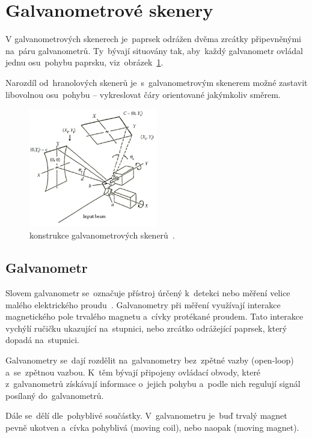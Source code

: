 \section{Galvanometrové skenery}
V galvanometrových skenerech je~paprsek odrážen dvěma zrcátky připevněnými na~páru galvanometrů. Ty~bývají situovány tak, aby~každý galvanometr ovládal jednu osu~pohybu paprsku, viz~obrázek~\ref{fig:scanner-constructions}.~\cite{scanning-handbook}

Narozdíl od~hranolových skenerů je~s~galvanometrovým skenerem možné zastavit libovolnou osu~pohybu -- vykreslovat čáry orientované jakýmkoliv směrem.

\begin{figure}[htb]
  \centering
  \includegraphics[width=0.5\textwidth]{img/scanner-constructions.jpg}
  \caption{\label{fig:scanner-constructions} konstrukce galvanometrových skenerů~\cite{scanning-handbook}.}
\end{figure}

\subsection{Galvanometr}
Slovem galvanometr se~označuje přístroj úrčený k~detekci nebo měření velice malého elektrického proudu~\cite{galvo-definition}. Galvanometry při měření využívají interakce magnetického pole trvalého magnetu a~cívky protékané proudem. Tato interakce vychýlí ručičku ukazující na~stupnici, nebo zrcátko odrážející paprsek, který dopadá na~stupnici.~\cite{wiki-galvo}

Galvanometry se~dají rozdělit na~galvanometry bez~zpětné vazby (open-loop) a~se~zpětnou vazbou. K~těm bývají připojeny ovládací obvody, které z~galvanometrů získávají informace o~jejich pohybu a~podle nich regulují signál posílaný do~galvanometrů.~\cite{wiki-galvo}

Dále se~dělí dle~pohyblivé součástky. V~galvanometru je~buď trvalý magnet pevně ukotven a~cívka pohyblivá (moving coil), nebo naopak (moving magnet). %

